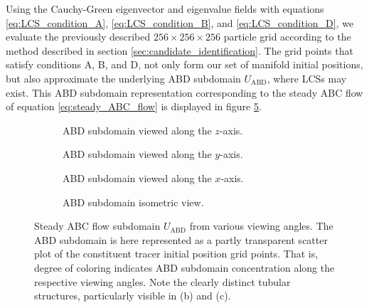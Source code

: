 Using the Cauchy-Green eigenvector and eigenvalue fields with equations \eqref{eq:LCS_condition_A}, \eqref{eq:LCS_condition_B}, and \eqref{eq:LCS_condition_D}, we evaluate the previously described $256\times256\times256$ particle grid according to the method described in section \ref{sec:candidate_identification}. The grid points that satisfy conditions A, B, and D, not only form our set of manifold initial positions, but also approximate the underlying ABD subdomain $U_{\text{ABD}}$, where LCSs may exist. This ABD subdomain representation corresponding to the steady ABC flow of equation \ref{eq:steady_ABC_flow} is displayed in figure \ref{fig:time_indep_ABD}. 

\begin{figure}[h!] 

\centering
\begin{subfigure}[b]{0.45\textwidth}
\centering

\caption{ABD subdomain viewed along the $z$-axis.}\label{fig:time_indep_ABD_a}
\end{subfigure}
\begin{subfigure}[b]{0.45\textwidth}
\centering

\caption{ABD subdomain viewed along the $y$-axis.}\label{fig:time_indep_ABD_b}
\end{subfigure}
\begin{subfigure}[b]{0.45\textwidth}
\centering

\caption{ABD subdomain viewed along the $x$-axis.}\label{fig:time_indep_ABD_c}
\end{subfigure}
\begin{subfigure}[b]{0.45\textwidth}
\centering

\caption{ABD subdomain isometric view.}\label{fig:time_indep_ABD_d}
\end{subfigure}

\caption{Steady ABC flow subdomain $U_{\text{ABD}}$ from various viewing angles. The ABD subdomain is here represented as a partly transparent scatter plot of the constituent tracer initial position grid points. That is, degree of coloring indicates ABD subdomain concentration along the respective viewing angles. Note the clearly distinct tubular structures, particularly visible in (b) and (c).}\label{fig:time_indep_ABD}
\end{figure}

